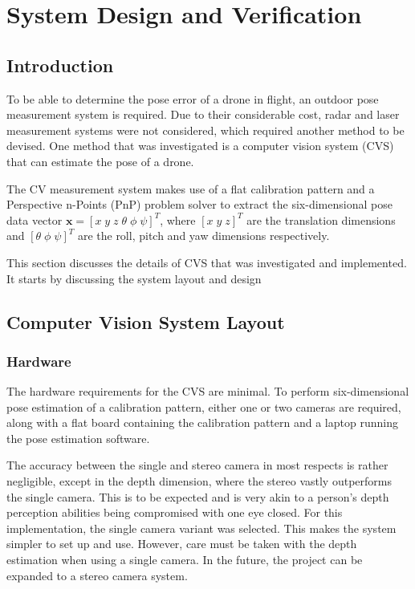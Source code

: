 \chapter{System Design and Verification}

\section{Introduction}

To be able to determine the pose error of a drone in flight, an outdoor pose measurement system is required. Due to their considerable cost, radar and laser measurement systems were not considered, which required another method to be devised. One method that was investigated is a computer vision system (CVS) that can estimate the pose of a drone.

The CV measurement system makes use of a flat calibration pattern and a Perspective n-Points (PnP) problem solver to extract the six-dimensional pose data vector $\bm{x} = {[x\;y\;z\;\theta\;\phi\;\psi]}^T$, where ${[x\;y\;z]}^T$ are the translation dimensions and ${[\theta\;\phi\;\psi]}^T$ are the roll, pitch and yaw dimensions respectively. 

This section discusses the details of CVS that was investigated and implemented. It starts by discussing the system layout and design

\section{Computer Vision System Layout}

\subsection{Hardware}

The hardware requirements for the CVS are minimal. To perform six-dimensional pose estimation of a calibration pattern, either one or two cameras are required, along with a flat board containing the calibration pattern and a laptop running the pose estimation software. 

The accuracy between the single and stereo camera in most respects is rather negligible, except in the depth dimension, where the stereo vastly outperforms the single camera. This is to be expected and is very akin to a person's depth perception abilities being compromised with one eye closed. For this implementation, the single camera variant was selected. This makes the system simpler to set up and use. However, care must be taken with the depth estimation when using a single camera. In the future, the project can be expanded to a stereo camera system.

